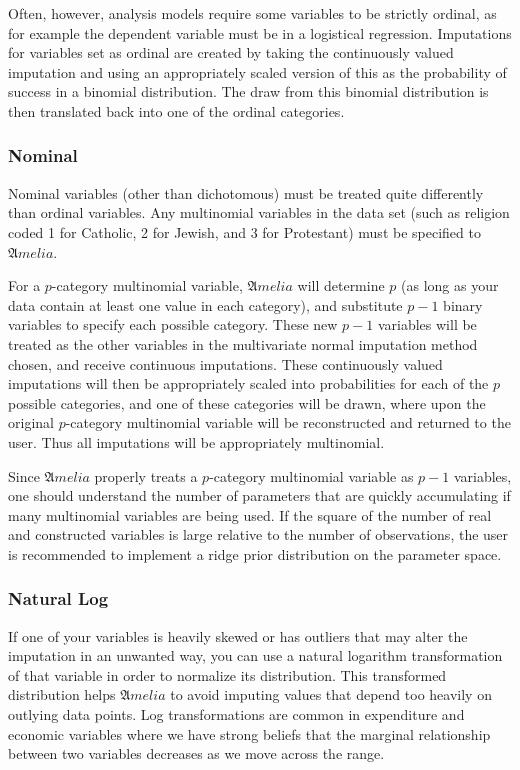 \documentclass[12pt,titlepage]{article}
\begin{document}
Often, however, analysis models require some variables to be strictly
ordinal, as for example the dependent variable must be in a logistical
regression.  Imputations for variables set as ordinal are created by
taking the continuously valued imputation and using an appropriately
scaled version of this as the probability of success in a binomial
distribution. The draw from this binomial distribution is then
translated back into one of the ordinal categories.

\subsubsection{Nominal}
\label{sec:nom}
Nominal variables (other than dichotomous) must be treated quite
differently than ordinal variables. Any multinomial variables in the
data set (such as religion coded 1 for Catholic, 2 for Jewish, and 3
for Protestant) must be specified to ${\mathfrak Amelia}$.

For a $ p$-category multinomial variable, ${\mathfrak Amelia}$ will
determine $ p$ (as long as your data contain at least one value in each
category), and substitute $ p-1$ binary variables to specify each
possible category. These new $ p-1$ variables will be treated as the
other variables in the multivariate normal imputation method chosen,
and receive continuous imputations. These continuously valued
imputations will then be appropriately scaled into probabilities for
each of the $ p$ possible categories, and one of these categories will
be drawn, where upon the original $ p$-category multinomial variable
will be reconstructed and returned to the user. Thus all imputations
will be appropriately multinomial.

Since ${\mathfrak Amelia}$ properly treats a $ p$-category multinomial
variable as $ p-1$ variables, one should understand the number of
parameters that are quickly accumulating if many multinomial variables
are being used. If the square of the number of real and constructed
variables is large relative to the number of observations, the user is
recommended to implement a ridge prior distribution on the parameter
space.

\subsubsection{Natural Log}
\label{sec:log}
If one of your variables is heavily skewed or has outliers that may
alter the imputation in an unwanted way, you can use a natural
logarithm transformation of that variable in order to normalize its
distribution.  This transformed distribution helps ${\mathfrak Amelia}$
to avoid imputing values that depend too heavily on outlying data
points.  Log transformations are common in expenditure and economic
variables where we have strong beliefs that the marginal relationship
between two variables decreases as we move across the range.
\end{document}
